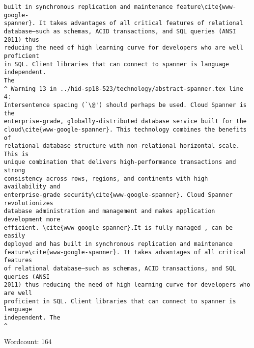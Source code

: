 \begin{IU}
\begin{tiny}
\begin{verbatim}
built in synchronous replication and maintenance feature\cite{www-google-
spanner}. It takes advantages of all critical features of relational
database—such as schemas, ACID transactions, and SQL queries (ANSI 2011) thus
reducing the need of high learning curve for developers who are well proficient
in SQL. Client libraries that can connect to spanner is language independent.
The
^ Warning 13 in ../hid-sp18-523/technology/abstract-spanner.tex line 4:
Intersentence spacing (`\@') should perhaps be used. Cloud Spanner is the
enterprise-grade, globally-distributed database service built for the
cloud\cite{www-google-spanner}. This technology combines the benefits of
relational database structure with non-relational horizontal scale. This is
unique combination that delivers high-performance transactions and strong
consistency across rows, regions, and continents with high availability and
enterprise-grade security\cite{www-google-spanner}. Cloud Spanner revolutionizes
database administration and management and makes application development more
efficient. \cite{www-google-spanner}.It is fully managed , can be easily
deployed and has built in synchronous replication and maintenance
feature\cite{www-google-spanner}. It takes advantages of all critical features
of relational database—such as schemas, ACID transactions, and SQL queries (ANSI
2011) thus reducing the need of high learning curve for developers who are well
proficient in SQL. Client libraries that can connect to spanner is language
independent. The
^
\end{verbatim}
\end{tiny}

Wordcount: 164

\end{IU}



